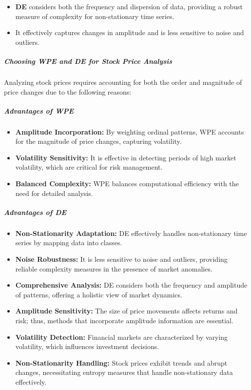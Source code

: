 \begin{itemize} \item \textbf{DE} considers both the frequency and dispersion of data, providing a robust measure of complexity for non-stationary time series. \item It effectively captures changes in amplitude and is less sensitive to noise and outliers. \end{itemize}

\subparagraph{Choosing WPE and DE for Stock Price Analysis}
Analyzing stock prices requires accounting for both the order and magnitude of price changes due to the following reasons:

\subparagraph{Advantages of WPE}

\begin{itemize} \item \textbf{Amplitude Incorporation:} By weighting ordinal patterns, WPE accounts for the magnitude of price changes, capturing volatility. \item \textbf{Volatility Sensitivity:} It is effective in detecting periods of high market volatility, which are critical for risk management. \item \textbf{Balanced Complexity:} WPE balances computational efficiency with the need for detailed analysis. \end{itemize}

\subparagraph{Advantages of DE}

\begin{itemize} \item \textbf{Non-Stationarity Adaptation:} DE effectively handles non-stationary time series by mapping data into classes. \item \textbf{Noise Robustness:} It is less sensitive to noise and outliers, providing reliable complexity measures in the presence of market anomalies. \item \textbf{Comprehensive Analysis:} DE considers both the frequency and amplitude of patterns, offering a holistic view of market dynamics. \end{itemize}
\begin{itemize} \item \textbf{Amplitude Sensitivity:} The size of price movements affects returns and risk; thus, methods that incorporate amplitude information are essential. \item \textbf{Volatility Detection:} Financial markets are characterized by varying volatility, which influences investment decisions. \item \textbf{Non-Stationarity Handling:} Stock prices exhibit trends and abrupt changes, necessitating entropy measures that handle non-stationary data effectively. \end{itemize}

